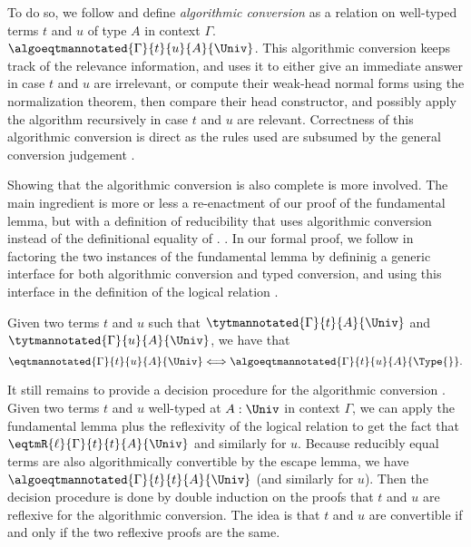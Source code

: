 To do so, we follow  and define 
\emph{algorithmic conversion} as a relation on well-typed 
terms \( t \) and \( u \) of type \( A \) in context \( \Gamma \).
$\algoeqtmannotated{\Gamma}{t}{u}{A}{\Univ}$.
%
This algorithmic conversion keeps track of the relevance information,
and uses it to either give an immediate answer in case \( t \) and
\( u \) are irrelevant, or compute their weak-head normal forms using
the normalization theorem, then compare their head constructor, and possibly apply the algorithm
recursively in case \( t \) and \( u \) are relevant.
%
Correctness of this algorithmic conversion is direct as the rules used are
subsumed by the general conversion judgement .

Showing that the algorithmic conversion is also complete is more involved.
%
The main ingredient is more or less a re-enactment of our proof of the 
fundamental lemma, but with a definition of reducibility that
uses algorithmic conversion instead of the definitional equality of \SetoidCC.
.
%
In our formal proof, we follow  in factoring the two
instances of the fundamental lemma by defininig a generic interface for both
algorithmic conversion and typed conversion, and using this interface
in the definition of the logical relation .

\begin{theorem}
  \label{thm:algoconv}
    Given two terms $t$ and $u$ such that
    $\tytmannotated{\Gamma}{t}{A}{\Univ}$ and
    $\tytmannotated{\Gamma}{u}{A}{\Univ}$, we have that
    $$ \eqtmannotated{\Gamma}{t}{u}{A}{\Univ} \Longleftrightarrow\algoeqtmannotated{\Gamma}{t}{u}{A}{\Type{}}.$$
\end{theorem}

It still remains to provide a decision procedure for the algorithmic
conversion .
%
Given two terms $t$ and $u$ well-typed at $A : \Univ$ in context
$\Gamma$, we can apply the fundamental lemma plus the reflexivity of
the logical relation to get the fact that $\eqtmR{\ell}{\Gamma}{t}{t}{A}{\Univ}$
and similarly for $u$.
%
Because reducibly equal terms are also algorithmically convertible by the escape lemma, we
have $\algoeqtmannotated{\Gamma}{t}{t}{A}{\Univ}$ (and similarly for $u$).
%
Then the decision procedure is done by double induction on the proofs
that $t$ and $u$ are reflexive for the algorithmic conversion.
%
The idea is that $t$ and $u$ are convertible if and only if the two reflexive proofs are the same.

